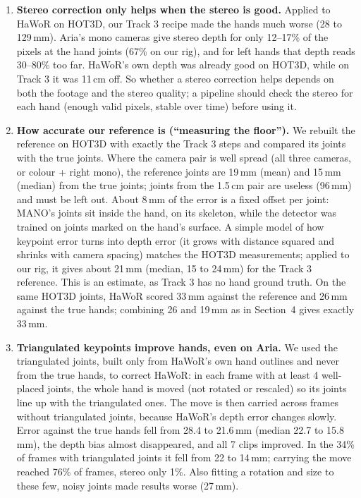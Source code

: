 \documentclass[10pt]{article}
\begin{document}
\begin{enumerate}[leftmargin=1.4em]
\item \textbf{Stereo correction only helps when the stereo is good.} Applied to HaWoR on HOT3D, our Track 3 recipe made the
hands much worse (28 to 129\,mm). Aria's mono cameras give stereo depth for only 12--17\% of the pixels at the hand joints
(67\% on our rig), and for left hands that depth reads 30--80\% too far. HaWoR's own depth was already good on HOT3D, while
on Track 3 it was 11\,cm off. So whether a stereo correction helps depends on both the footage and the stereo quality; a
pipeline should check the stereo for each hand (enough valid pixels, stable over time) before using it.
\item \textbf{How accurate our reference is (``measuring the floor'').} We rebuilt the reference on HOT3D with exactly the
Track 3 steps and compared its joints with the true joints. Where the camera pair is well spread (all three cameras, or
colour + right mono), the reference joints are 19\,mm (mean) and 15\,mm (median) from the true joints; joints from the
1.5\,cm pair are useless (96\,mm) and must be left out. About 8\,mm of the error is a fixed offset per joint: MANO's joints
sit inside the hand, on its skeleton, while the detector was trained on joints marked on the hand's surface. A simple model
of how keypoint error turns into depth error (it grows with distance squared and shrinks with camera spacing) matches
the HOT3D measurements; applied to our rig, it gives about 21\,mm (median, 15 to 24\,mm) for the Track 3 reference. This
is an estimate, as Track 3 has no hand ground truth. On the same HOT3D joints, HaWoR scored 33\,mm against the reference
and 26\,mm against the true hands; combining 26 and 19\,mm as in Section~4 gives exactly 33\,mm.
\item \textbf{Triangulated keypoints improve hands, even on Aria.} We used the triangulated joints, built only from HaWoR's
own hand outlines and never from the true hands, to correct HaWoR: in each frame with at least 4 well-placed joints, the
whole hand is moved (not rotated or rescaled) so its joints line up with the triangulated ones. The move is then carried
across frames without triangulated joints, because HaWoR's depth error changes slowly. Error against the true hands fell
from 28.4 to 21.6\,mm (median 22.7 to 15.8\,mm), the depth bias almost disappeared, and all 7 clips improved. In the 34\%
of frames with triangulated joints it fell from 22 to 14\,mm; carrying the move reached 76\% of frames, stereo only 1\%.
Also fitting a rotation and size to these few, noisy joints made results worse (27\,mm).
\end{enumerate}
\end{document}
